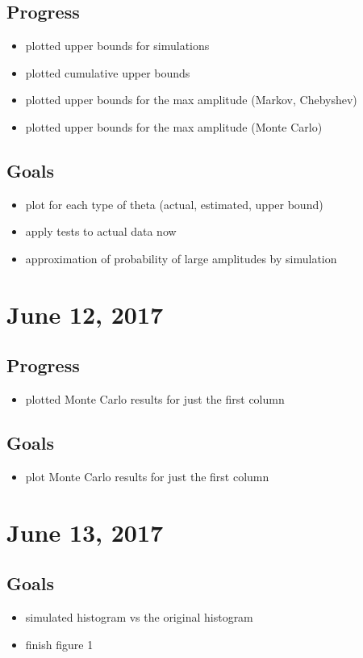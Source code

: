 \documentclass{article}
\begin{document}
\subsection{Progress}
\begin{itemize}
  \item plotted upper bounds for simulations
  \item plotted cumulative upper bounds
  \item plotted upper bounds for the max amplitude (Markov, Chebyshev)
  \item plotted upper bounds for the max amplitude (Monte Carlo)
\end{itemize}

\subsection{Goals}
\begin{itemize}
  \item plot for each type of theta (actual, estimated, upper bound)
  \item apply tests to actual data now
  \item approximation of probability of large amplitudes by simulation
\end{itemize}

\section{June 12, 2017}
\subsection{Progress}
\begin{itemize}
  \item plotted Monte Carlo results for just the first column
\end{itemize}

\subsection{Goals}
\begin{itemize}
  \item plot Monte Carlo results for just the first column
\end{itemize}

\section{June 13, 2017}
\subsection{Goals}
\begin{itemize}
  \item simulated histogram vs the original histogram
  \item finish figure 1
\end{itemize}
\end{document}
